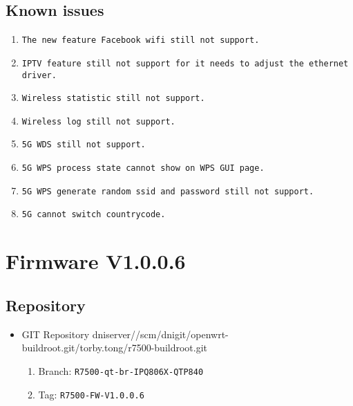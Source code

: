 \documentclass[12pt]{report}
\newcommand{\tlabel}[1]{
  \label{#1}%
  }
\begin{document}
\subsection{Known issues}
            \begin{enumerate}
		\item \texttt{The new feature Facebook wifi still not support.}
		\item \texttt{IPTV feature still not support for it needs to adjust the ethernet driver.}
		\item \texttt{Wireless statistic still not support.}
		\item \texttt{Wireless log still not support.}
		\item \texttt{5G WDS still not support.}
		\item \texttt{5G WPS process state cannot show on WPS GUI page.}
		\item \texttt{5G WPS generate random ssid and password still not support.}
		\item \texttt{5G cannot switch countrycode.}
            \end{enumerate}

\section{Firmware V1.0.0.6}

\tlabel{sec:1-0-1}
\subsection{Repository}
\begin{itemize}
	\item GIT Repository dniserver//scm/dnigit/openwrt-buildroot.git/torby.tong/r7500-buildroot.git
	\begin{enumerate}
    		\item Branch: \texttt{R7500-qt-br-IPQ806X-QTP840}
                \item Tag: \texttt{R7500-FW-V1.0.0.6}
	\end{enumerate}
\end{itemize}
\end{document}
